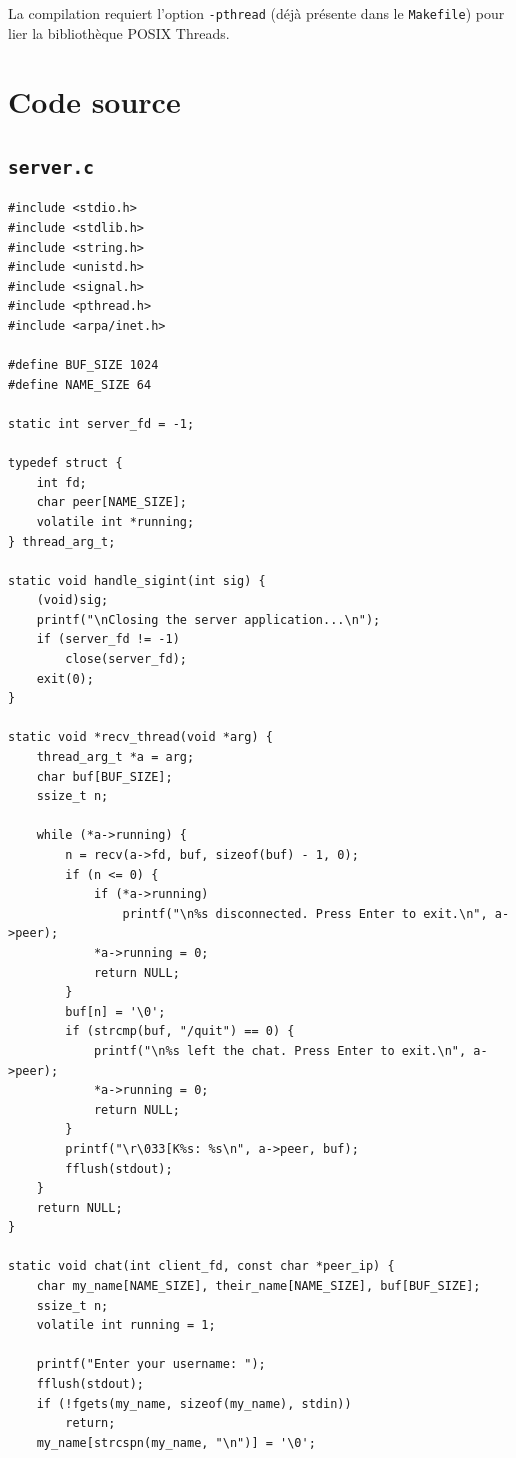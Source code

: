 \documentclass[12pt,a4paper]{article}
\begin{document}
La compilation requiert l'option \texttt{-pthread} (déjà présente dans le
\texttt{Makefile}) pour lier la bibliothèque POSIX Threads.

\section{Code source}

\subsection{\texttt{server.c}}

\begin{lstlisting}[caption={\texttt{server.c} --- serveur de chat full-duplex multithreadé}]
#include <stdio.h>
#include <stdlib.h>
#include <string.h>
#include <unistd.h>
#include <signal.h>
#include <pthread.h>
#include <arpa/inet.h>

#define BUF_SIZE 1024
#define NAME_SIZE 64

static int server_fd = -1;

typedef struct {
    int fd;
    char peer[NAME_SIZE];
    volatile int *running;
} thread_arg_t;

static void handle_sigint(int sig) {
    (void)sig;
    printf("\nClosing the server application...\n");
    if (server_fd != -1)
        close(server_fd);
    exit(0);
}

static void *recv_thread(void *arg) {
    thread_arg_t *a = arg;
    char buf[BUF_SIZE];
    ssize_t n;

    while (*a->running) {
        n = recv(a->fd, buf, sizeof(buf) - 1, 0);
        if (n <= 0) {
            if (*a->running)
                printf("\n%s disconnected. Press Enter to exit.\n", a->peer);
            *a->running = 0;
            return NULL;
        }
        buf[n] = '\0';
        if (strcmp(buf, "/quit") == 0) {
            printf("\n%s left the chat. Press Enter to exit.\n", a->peer);
            *a->running = 0;
            return NULL;
        }
        printf("\r\033[K%s: %s\n", a->peer, buf);
        fflush(stdout);
    }
    return NULL;
}

static void chat(int client_fd, const char *peer_ip) {
    char my_name[NAME_SIZE], their_name[NAME_SIZE], buf[BUF_SIZE];
    ssize_t n;
    volatile int running = 1;

    printf("Enter your username: ");
    fflush(stdout);
    if (!fgets(my_name, sizeof(my_name), stdin))
        return;
    my_name[strcspn(my_name, "\n")] = '\0';


\end{lstlisting}
\end{document}
